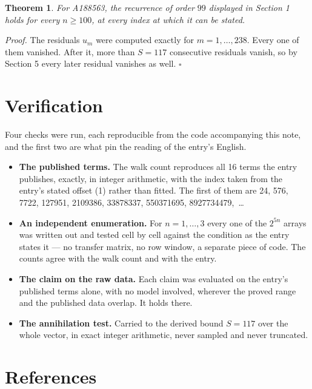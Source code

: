 \documentclass[11pt]{article}
\newtheorem{theorem}{Theorem}
\theoremstyle{definition}
\begin{document}
\begin{theorem} For A188563, the recurrence of order $99$ displayed in Section 1 holds for every $n \ge 100$, at every index at which it can be stated.\end{theorem}

{\itshape Proof.} The residuals $u_m$ were computed exactly for $m = 1,\dots,238$. Every one of them vanished. After it, more than $S = 117$ consecutive residuals vanish, so by Section 5 every later residual vanishes as well. $\square$

\section{Verification}

Four checks were run, each reproducible from the code accompanying this note, and the first two are what pin the reading of the entry's English.

\begin{itemize}

\item {\bfseries The published terms.} The walk count reproduces all 16 terms the entry publishes, exactly, in integer arithmetic, with the index taken from the entry's stated offset (1) rather than fitted. The first of them are 24, 576, 7722, 127951, 2109386, 33878337, 550371695, 8927734479,~\dots

\item {\bfseries An independent enumeration.} For $n = 1,\dots,3$ every one of the $2^{5n}$ arrays was written out and tested cell by cell against the condition as the entry states it --- no transfer matrix, no row window, a separate piece of code. The counts agree with the walk count and with the entry.

\item {\bfseries The claim on the raw data.} Each claim was evaluated on the entry's published terms alone, with no model involved, wherever the proved range and the published data overlap. It holds there.

\item {\bfseries The annihilation test.} Carried to the derived bound $S = 117$ over the whole vector, in exact integer arithmetic, never sampled and never truncated.

\end{itemize}

\section{References}
\end{document}
